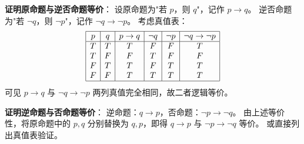 \begin{proofbox}
\textbf{证明原命题与逆否命题等价}：
设原命题为"若 \(p\)，则 \(q\)"，记作 \(p\to q\)。
逆否命题为"若 \(\lnot q\)，则 \(\lnot p\)"，记作 \(\lnot q\to\lnot p\)。
考虑真值表：
\[
\begin{array}{|c|c|c|c|c|c|}
\hline
p & q & p\to q & \lnot q & \lnot p & \lnot q\to\lnot p \\ \hline
T & T & T & F & F & T \\
T & F & F & T & F & F \\
F & T & T & F & T & T \\
F & F & T & T & T & T \\ \hline
\end{array}
\]
可见 \(p\to q\) 与 \(\lnot q\to\lnot p\) 两列真值完全相同，故二者逻辑等价。
\end{proofbox}

\begin{proofbox}
\textbf{证明逆命题与否命题等价}：
逆命题：\(q\to p\)，否命题：\(\lnot p\to\lnot q\)。
由上述等价性，将原命题中的 \(p,q\) 分别替换为 \(q,p\)，即得 \(q\to p\) 与 \(\lnot p\to\lnot q\) 等价。
或直接列出真值表验证。
\end{proofbox}
